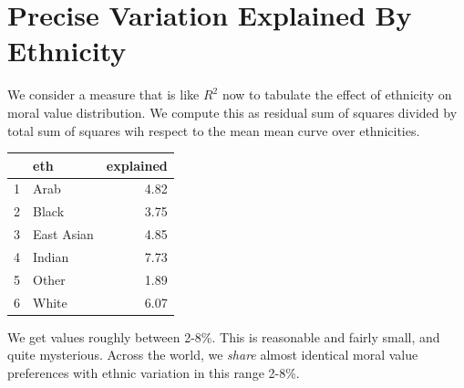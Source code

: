 \documentclass{amsart}
\begin{document}
\section{Precise Variation Explained By Ethnicity}

We consider a measure that is like $R^2$ now to tabulate the effect of ethnicity on moral value distribution.  We compute this as residual sum of squares divided by total sum of squares wih respect to the mean mean curve over ethnicities.

\begin{table}[ht]
\centering
\begin{tabular}{rlr}
  \hline
 & eth & explained \\ 
  \hline
1 & Arab & 4.82 \\ 
  2 & Black & 3.75 \\ 
  3 & East Asian & 4.85 \\ 
  4 & Indian & 7.73 \\ 
  5 & Other & 1.89 \\ 
  6 & White & 6.07 \\ 
   \hline
\end{tabular}
\end{table}

We get values roughly between 2-8\%.  This is reasonable and fairly small, and quite mysterious.  Across the world, we {\em share} almost identical moral value preferences with ethnic variation in this range 2-8\%.  
\end{document}
